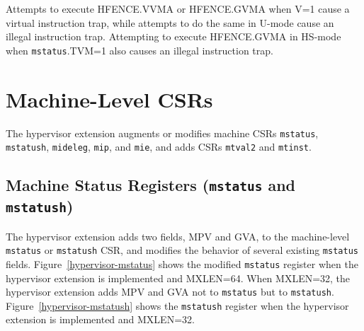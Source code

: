 Attempts to execute HFENCE.VVMA or HFENCE.GVMA when V=1 cause a virtual
instruction trap, while attempts to do the same in U-mode
cause an illegal instruction trap.
Attempting to execute HFENCE.GVMA in HS-mode when {\tt mstatus}.TVM=1
also causes an illegal instruction trap.

\section{Machine-Level CSRs}

The hypervisor extension augments or modifies machine CSRs {\tt mstatus},
{\tt mstatush}, {\tt mideleg}, {\tt mip}, and {\tt mie}, and
adds CSRs {\tt mtval2} and {\tt mtinst}.

\subsection{Machine Status Registers ({\tt mstatus} and {\tt mstatush})}

The hypervisor extension adds two fields, MPV and GVA, to the
machine-level {\tt mstatus} or {\tt mstatush} CSR, and modifies the
behavior of several existing {\tt mstatus} fields.
Figure~\ref{hypervisor-mstatus} shows the modified {\tt mstatus} register
when the hypervisor extension is implemented and MXLEN=64.
When MXLEN=32, the hypervisor extension adds MPV and GVA not to {\tt mstatus}
but to {\tt mstatush}.
Figure~\ref{hypervisor-mstatush} shows the {\tt mstatush} register when
the hypervisor extension is implemented and MXLEN=32.

